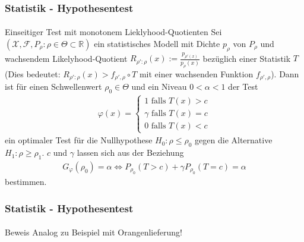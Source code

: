 \documentclass{beamer}
\begin{document}
\begin{frame}
    \frametitle{Statistik - Hypothesentest}
\framesubtitle{}

\begin{block}{Einseitiger Test mit monotonem Lieklyhood-Quotienten}
Sei   $(\mathcal{X}, \mathcal{F}, P_\rho :  \rho \in \Theta \subset \mathbb{R})$ ein statistisches Modell mit Dichte $p_{\rho}$ von $P_\rho$ und wachsendem  Likelyhood-Quotient  $R_{\rho' : \rho} (x):= \frac{p_{\rho' (x)}}{p_{\rho}(x)}$ bezüglich einer Statistik  $T$ (Dies bedeutet: $R_{\rho' : \rho} (x) > f_{\rho', \rho} \circ T$ mit einer wachsenden Funktion $f_{\rho', \rho}$). Dann ist für einen  Schwellenwert $\rho_0 \in \Theta$ und ein Niveau $0 <\alpha < 1$ der Test 
\begin{align*}
 \varphi(x) = \begin{cases} 1 \text{ falls } T(x) > c \\  \gamma  \text{ falls } T(x) = c \\ 0 \text{ falls } T(x) < c  \end{cases}
\end{align*}
ein optimaler Test für die Nullhypothese $H_0 : \rho \leq \rho_0$ gegen die Alternative  $H_1 : \rho \geq \rho_1$. 
$c$ und $\gamma$ lassen sich aus der Beziehung
\begin{align}
G_\varphi(\rho_0) = \alpha  \Leftrightarrow P_{\rho_0}(T  > c) + \gamma P_{\rho_0}(T = c) = \alpha
\end{align}
 bestimmen.
\end{block}



 \end{frame}



\begin{frame}
    \frametitle{Statistik - Hypothesentest}
\framesubtitle{}

\begin{block}{Beweis}
Analog zu  Beispiel mit Orangenlieferung!
\end{block}

 \end{frame}
\end{document}
